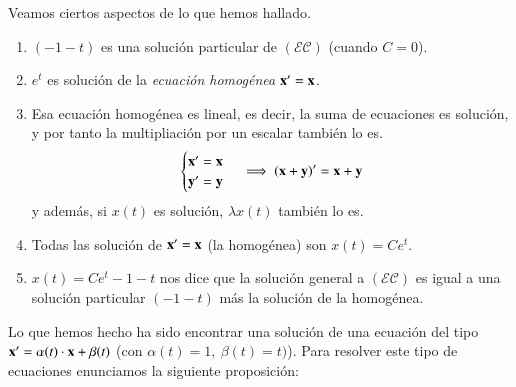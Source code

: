 \begin{obs}
    Veamos ciertos aspectos de lo que hemos hallado.\\
    \begin{enumerate}
        \item $(-1-t)$ es una solución particular de $\mathcal{(EC)}$ (cuando $C=0$).
        \item $e^t$ es solución de la \textit{ecuación homogénea} $\mathbf{x'} = \mathbf{x}$.
        \item Esa ecuación homogénea es lineal, es decir, la suma de ecuaciones es solución, y por tanto la multipliación por un escalar también lo es.
        $$
        \begin{cases}
            \mathbf{x'} = \mathbf{x}\\ \mathbf{y'} = \mathbf{y}
        \end{cases}
        \implies (\mathbf{x}+\mathbf{y})' = \mathbf{x} + \mathbf{y}
        $$
        y además, si $x(t)$ es solución, $\lambda x(t)$ también lo es.
        \item Todas las solución de $\mathbf{x'} = \mathbf{x}$ (la homogénea) son $x(t) = Ce^t$.
        \item $x(t) = Ce^t - 1 - t$ nos dice que la solución general a $\mathcal{(EC)}$ es igual a una solución particular $(-1-t)$ más la solución de la homogénea.
    \end{enumerate}
\end{obs}
Lo que hemos hecho ha sido encontrar una solución de una ecuación del tipo $\mathbf{x'} = \alpha(t)\cdot\mathbf{x}+\beta(t)$ (con $\alpha(t) = 1,\ \beta(t) = t)$). Para resolver este tipo de ecuaciones enunciamos la siguiente proposición:

